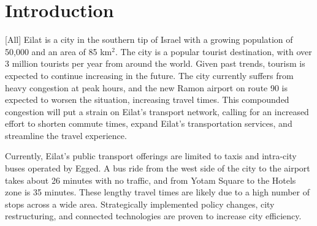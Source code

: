 \documentclass[12pt]{article}                       %
\newcommand{\textapprox}{\raisebox{0.1ex}{\texttildelow}}
\begin{document}
\begin{abstract}
    Eilat is a city in southern Israel with a population of \textapprox50,000, but over 3 million tourists per year. The city suffers from severe congestion during commuting hours, with traffic jams along major city roads and backed up lines of cars waiting to enter the city by the highway in the north. This project aimed to aid Eilat city planners in its goal to improve its transportation service offerings while minimzing environmental impact, and investigate smart city technologies to reduce congestion. Extensive research on smart cities was conducted, including case studies of other cities, listings of smart city tools, and their applications to Eilat. To further aid city planners in visualizing data, an extensible interactive website was created that displays mapping information and data on flights entering the region. Suggestions for services and citywide goals were developed to guide Eilat towards reducing congestion and becoming a smart city.
\end{abstract}

\newpage
\tableofcontents
\vspace{1cm}
\listoffigures \newpage
\listofauthorships
\newpage
{}
\doublespacing

\section{Introduction}[All]
Eilat is a city in the southern tip of Israel with a growing population of \textapprox50,000 and an area of 85 km$^2$. The city is a popular tourist destination, with over 3 million tourists per year from around the world. Given past trends, tourism is expected to continue increasing in the future. The city currently suffers from heavy congestion at peak hours, and the new Ramon airport on route 90 is expected to worsen the situation, increasing travel times. This compounded congestion will put a strain on Eilat's transport network, calling for an increased effort to shorten commute times, expand Eilat's transportation services, and streamline the travel experience. 

Currently, Eilat's public transport offerings are limited to taxis and intra-city buses operated by Egged. A bus ride from the west side of the city to the airport takes about 26 minutes with no traffic, and from Yotam Square to the Hotels zone is 35 minutes. These lengthy travel times are likely due to a high number of stops across a wide area. Strategically implemented policy changes, city restructuring, and connected technologies are proven to increase city efficiency.
\end{document}
